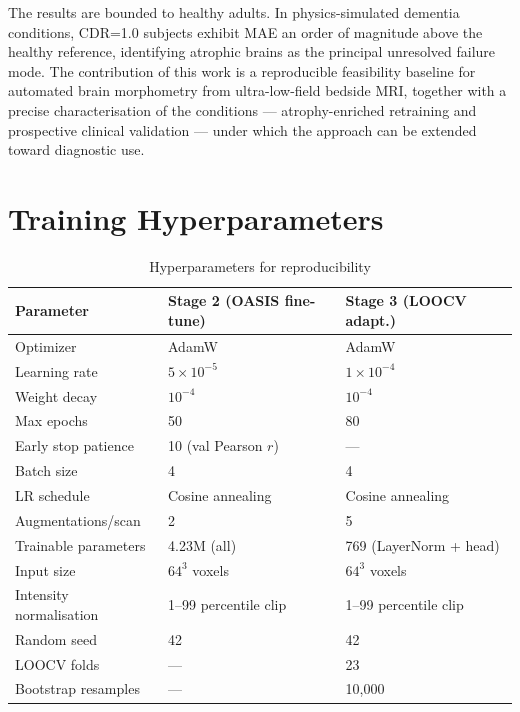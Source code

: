 \documentclass[12pt,a4paper]{article}
\begin{document}
The results are bounded to healthy adults. In physics-simulated
dementia conditions, CDR=1.0 subjects exhibit MAE an order of magnitude
above the healthy reference, identifying atrophic brains as the
principal unresolved failure mode. The contribution of this work is a
reproducible feasibility baseline for automated brain morphometry from
ultra-low-field bedside MRI, together with a precise characterisation
of the conditions --- atrophy-enriched retraining and prospective
clinical validation --- under which the approach can be extended toward
diagnostic use.

\appendix
\section{Training Hyperparameters}
\label{app:hyperparams}

\begin{table}[!h]
\caption{Hyperparameters for reproducibility}
\label{tab:hyper}
\centering
\setlength{\tabcolsep}{6pt}
\begin{tabular}{lll}
\toprule
Parameter & Stage 2 (OASIS fine-tune) & Stage 3 (LOOCV adapt.) \\
\midrule
Optimizer             & AdamW              & AdamW \\
Learning rate         & $5\times10^{-5}$   & $1\times10^{-4}$ \\
Weight decay          & $10^{-4}$          & $10^{-4}$ \\
Max epochs            & 50                 & 80 \\
Early stop patience   & 10 (val Pearson $r$) & --- \\
Batch size            & 4                  & 4 \\
LR schedule           & Cosine annealing   & Cosine annealing \\
Augmentations/scan    & 2                  & 5 \\
Trainable parameters  & 4.23M (all)        & 769 (LayerNorm + head) \\
Input size            & $64^3$ voxels      & $64^3$ voxels \\
Intensity normalisation & 1--99 percentile clip & 1--99 percentile clip \\
Random seed           & 42                 & 42 \\
LOOCV folds           & ---                & 23 \\
Bootstrap resamples   & ---                & 10{,}000 \\
\bottomrule
\end{tabular}
\end{table}
\end{document}
